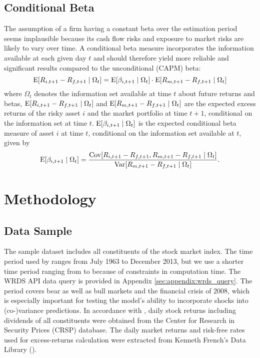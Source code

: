 \documentclass[11pt,a4paper]{article}
\begin{document}
\subsection{Conditional Beta}

The assumption of a firm having a constant beta over the estimation period seems implausible because its cash flow risks and exposure to market risks are likely to vary over time. A conditional beta measure incorporates the information available at each given day $t$ and should therefore yield more reliable and significant results compared to the unconditional (CAPM) beta:
\begin{equation}
\textrm{E}[R_{i,t+1} - R_{f,t+1} \mid \Omega_t] = \textrm{E}[\beta_{i,t+1} \mid \Omega_t] \cdot \textrm{E}[R_{m,t+1} - R_{f,t+1} \mid \Omega_t]
\end{equation}
where $\Omega_t$ denotes the information set available at time $t$ about future returns and betas, $\textrm{E}[R_{i,t+1} - R_{f,t+1} \mid \Omega_t]$ and $\textrm{E}[R_{m,t+1} - R_{f,t+1} \mid \Omega_t]$ are the expected excess returns of the risky asset $i$ and the market portfolio at time $t+1$, conditional on the information set at time $t$. $\textrm{E}[\beta_{i,t+1} \mid \Omega_t]$ is the expected conditional beta measure of asset $i$ at time $t$, conditional on the information set available at $t$, given by
\begin{equation}
    \textrm{E}[\beta_{i,t+1} \mid \Omega_t] = \dfrac{ \textrm{Cov}[ R_{i,t+1} - R_{f,t+1}, R_{m,t+1} - R_{f,t+1} \mid \Omega_t ] }{ \textrm{Var}[ R_{m,t+1} - R_{f,t+1} \mid \Omega_t ]  }.
\end{equation}








\newpage
\section{Methodology}

\subsection{Data Sample}

The sample dataset includes all constituents of the \indexName{} stock market index. The time period used by  ranges from July 1963 to December 2013, but we use a shorter time period ranging from \periodFrom{} to \periodTo{} because of constraints in computation time. The WRDS API data query is provided in Appendix \ref{sec:appendix:wrds_query}. The period covers bear as well as bull markets and the financial crisis of 2008, which is especially important for testing the model's ability to incorporate shocks into (co-)variance predictions. In accordance with , daily stock returns including dividends of all \indexName{} constituents were obtained from the Center for Research in Security Prices (CRSP) database. The daily market returns and risk-free rates used for excess-returns calculation were extracted from Kenneth French's Data Library ().
\end{document}
